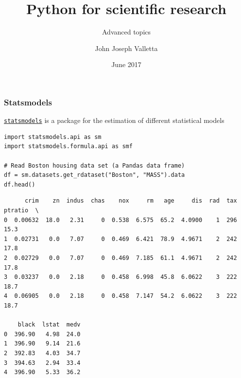 \documentclass[pdf]{beamer}
\title[Python for scientific research]{Python for scientific research}
\subtitle{Advanced topics}
\author{John Joseph Valletta}
\date[June 2017]{June 2017}
\institute[]{University of Exeter, Penryn Campus, UK}
\begin{document}
\begin{frame}
\titlepage
\end{frame}

\begin{frame}[fragile]
\frametitle{Statsmodels}

\href{http://www.statsmodels.org/stable/index.html}{\texttt{statsmodels}} is a package 
for the estimation of different statistical models

\vfill

\begin{lstlisting}[style=python]
import statsmodels.api as sm
import statsmodels.formula.api as smf

# Read Boston housing data set (a Pandas data frame)
df = sm.datasets.get_rdataset("Boston", "MASS").data
df.head()
\end{lstlisting}

\vspace{-0.8cm}
{\fontsize{6}{7}\selectfont
\begin{verbatim}
      crim    zn  indus  chas    nox     rm   age     dis  rad  tax  ptratio  \
0  0.00632  18.0   2.31     0  0.538  6.575  65.2  4.0900    1  296     15.3   
1  0.02731   0.0   7.07     0  0.469  6.421  78.9  4.9671    2  242     17.8   
2  0.02729   0.0   7.07     0  0.469  7.185  61.1  4.9671    2  242     17.8   
3  0.03237   0.0   2.18     0  0.458  6.998  45.8  6.0622    3  222     18.7   
4  0.06905   0.0   2.18     0  0.458  7.147  54.2  6.0622    3  222     18.7   

    black  lstat  medv  
0  396.90   4.98  24.0  
1  396.90   9.14  21.6  
2  392.83   4.03  34.7  
3  394.63   2.94  33.4  
4  396.90   5.33  36.2
\end{verbatim}}

\end{frame}
\end{document}
